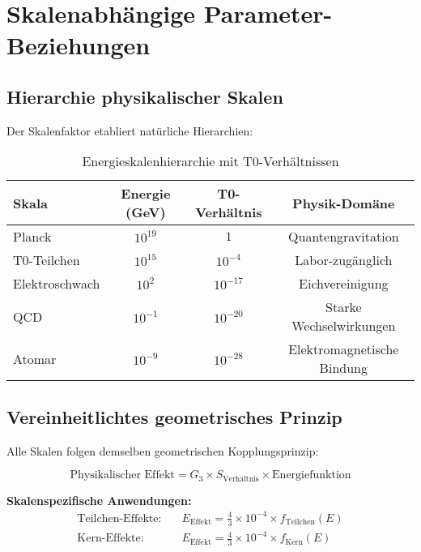 \documentclass[12pt,a4paper]{report}
\begin{document}
	\section{Skalenabhängige Parameter-Beziehungen}
	\label{sec:scale_dependent}
	
	\subsection{Hierarchie physikalischer Skalen}
	\label{subsec:hierarchy_scales}
	
	Der Skalenfaktor etabliert natürliche Hierarchien:
	
	\begin{table}[htbp]
		\centering
		\begin{tabular}{lccc}
			\toprule
			\textbf{Skala} & \textbf{Energie (GeV)} & \textbf{T0-Verhältnis} & \textbf{Physik-Domäne} \\
			\midrule
			Planck & $10^{19}$ & $1$ & Quantengravitation \\
			T0-Teilchen & $10^{15}$ & $10^{-4}$ & Labor-zugänglich \\
			Elektroschwach & $10^{2}$ & $10^{-17}$ & Eichvereinigung \\
			QCD & $10^{-1}$ & $10^{-20}$ & Starke Wechselwirkungen \\
			Atomar & $10^{-9}$ & $10^{-28}$ & Elektromagnetische Bindung \\
			\bottomrule
		\end{tabular}
		\caption{Energieskalenhierarchie mit T0-Verhältnissen}
		\label{tab:energy_hierarchy}
	\end{table}
	
	\subsection{Vereinheitlichtes geometrisches Prinzip}
	\label{subsec:unified_geometric_principle}
	
	Alle Skalen folgen demselben geometrischen Kopplungsprinzip:
	
	\begin{equation}
		\text{Physikalischer Effekt} = G_3 \times S_{\text{Verhältnis}} \times \text{Energiefunktion}
	\end{equation}
	
	\textbf{Skalenspezifische Anwendungen:}
	\begin{align}
		\text{Teilchen-Effekte:} \quad &E_{\text{Effekt}} = \frac{4}{3} \times 10^{-4} \times f_{\text{Teilchen}}(E) \\
		\text{Kern-Effekte:} \quad &E_{\text{Effekt}} = \frac{4}{3} \times 10^{-4} \times f_{\text{Kern}}(E)
	\end{align}
	
\end{document}
